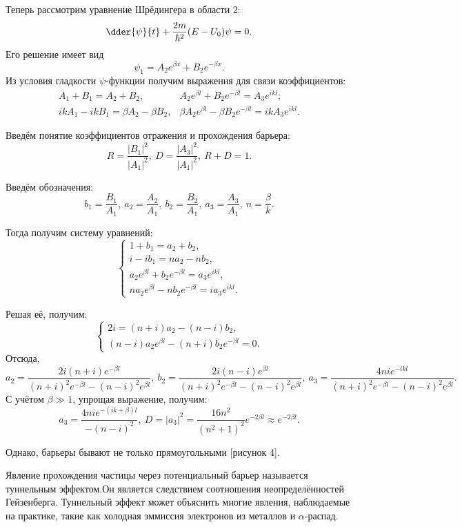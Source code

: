 Теперь рассмотрим уравнение Шрёдингера в области 2:
\[
    \dder{\psi}{t} + \frac{2m}{\hbar^2}(E - U_0)\psi = 0.
\]
Его решение имеет вид
\[
    \psi_1 = A_2 e^{\beta x} + B_2 e^{-\beta x}.
\]
Из условия гладкости \( \psi \)-функции получим выражения для связи коэффициентов:
\begin{align*}
    A_1 + B_1 = A_2 + B_2, & A_2 e^{\beta l} + B_2 e^{-\beta l} = A_3 e^{ikl};\\
    ik A_1 - ik B_1 = \beta A_2 - \beta B_2, & \beta A_2 e^{\beta l} - \beta
    B_2 e^{-\beta l} = ik A_3 e^{ikl}. 
\end{align*}

Введём понятие коэффициентов отражения и прохождения барьера:
\[
    R = \frac{|B_1|^2}{|A_1|^2},\ 
    D = \frac{|A_3|^2}{|A_1|^2},\ 
    R + D = 1.
\]

Введём обозначения:
\[
    b_1 = \frac{B_1}{A_1},\ a_2 = \frac{A_2}{A_1},\ b_2 = \frac{B_2}{A_1},\ 
    a_3 = \frac{A_3}{A_1},\ n = \frac{\beta}{k}.
\]

Тогда получим систему уравнений:
\[
    \left\{
    \begin{array}{l}
        1 + b_1 = a_2 + b_2, \\
        i - ib_1 = n a_2 - n b_2, \\
        a_2 e^{\beta l} + b_2 e^{-\beta l} = a_3 e^{ikl}, \\
        na_2 e^{\beta l} - nb_2e^{-\beta l} = ia_3 e^{ikl}.
    \end{array}
    \right.
\]

Решая её, получим:
\[
    \left\{
    \begin{array}{l}
        2i = (n+i)a_2 - (n-i)b_2, \\
        (n-i)a_2 e^{\beta l} - (n+i)b_2 e^{-\beta l} = 0.
    \end{array}
    \right.
\]
Отсюда,
\[
    a_2 = \frac{2i(n+i)e^{-\beta l}}{(n+i)^2e^{-\beta l} - (n-i)^2e^{\beta l}},\  
    b_2 = \frac{2i(n-i)e^{\beta l}}{(n+i)^2e^{-\beta l} - (n-i)^2e^{\beta l}},\ 
    a_3 = \frac{4nie^{-ikl}}{(n+i)^2 e^{-\beta l} - (n-i)^2 e^{\beta l}}.
\]
С учётом \( \beta \gg 1 \), упрощая выражение, получим:
\[
    a_3 = \frac{4nie^{-(ik+\beta)l}}{-(n-i)^2}, \ 
    D = |a_3|^2 = \frac{16n^2}{(n^2 + 1)^2} e^{-2\beta l} \approx e^{-2\beta l}. 
\]

Однако, барьеры бывают не только прямоугольными [рисунок 4].

Явление прохождения частицы через потенциальный барьер называется туннельным
эффектом.Он является следствием соотношения неопределённостей Гейзенберга.
Туннельный эффект может объяснить многие явления, наблюдаемые на практике, такие
как холодная эммиссия электронов из металлов и \( \alpha \)-распад.

